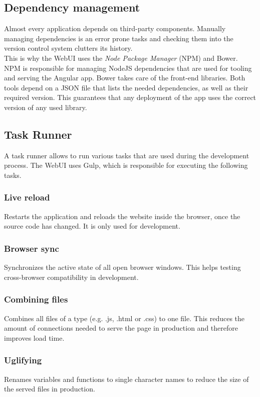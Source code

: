 \subsection{Dependency management}
Almost every application depends on third-party components. Manually managing dependencies is an error prone tasks and checking them into the version control system clutters its history.\\
This is why the WebUI uses the \textit{Node Package Manager} (NPM) and Bower. NPM is responsible for managing NodeJS dependencies that are used for tooling and serving the Angular app. Bower takes care of the front-end libraries. Both tools depend on a JSON file that lists the needed dependencies, as well as their required version. This guarantees that any deployment of the app uses the correct version of any used library.


\subsection{Task Runner}
A task runner allows to run various tasks that are used during the development process. The WebUI uses Gulp, which is responsible for executing the following tasks.

\subsubsection{Live reload} Restarts the application and reloads the website inside the browser, once the source code has changed. It is only used for development.

\subsubsection{Browser sync} Synchronizes the active state of all open browser windows. This helps testing cross-browser compatibility in development.

\subsubsection{Combining files} Combines all files of a type (e.g. .js, .html or .css) to one file. This reduces the amount of connections needed to serve the page in production and therefore improves load time.

\subsubsection{Uglifying} Renames variables and functions to single character names to reduce the size of the served files in production.

